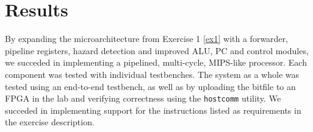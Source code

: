 \chapter{Results}

By expanding the microarchitecture from Exercise 1 \ref{ex1} with a forwarder, pipeline registers, hazard detection and improved ALU, PC and control modules, we succeded in implementing a pipelined, multi-cycle, MIPS-like processor.
Each component was tested with individual testbenches.
The system as a whole was tested using an end-to-end testbench, as well as by uploading the bitfile to an FPGA in the lab and verifying correctness using the \texttt{hostcomm} utility.
We succeded in implementing support for the instructions listed as requirements in the exercise description.

